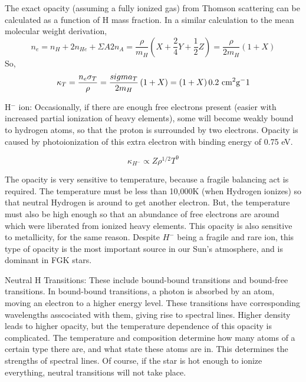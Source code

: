 \begin{enumerate}
      The exact opacity (assuming a fully ionized gas) from Thomson scattering can be calculated 
      as a function of H mass fraction.  In a similar calculation to the mean molecular weight 
      derivation, 
      \begin{equation}
      n_e=n_H+2n_{He}+\Sigma{A}{2}n_A=\frac{\rho}{m_H}\left(X+\frac{2}{4}Y+\frac{1}{2}Z\right)=\frac{\rho}{2m_H}\left(1+X\right)
      \end{equation}
      So,
      \begin{equation}
      \kappa_T=\frac{n_e\sigma_T}{\rho}=\frac{sigma_T}{2m_H}\left(1+X\right)=\left(1+X\right)0.2~{\rm cm^2 g^-1}
      \end{equation}
       
      H$^-$ ion: Occasionally, if there are enough free electrons present (easier with increased partial ionization of heavy elements), some will become weakly bound to hydrogen atoms, so that the proton is surrounded by two electrons. Opacity is caused by photoionization of this extra electron with binding energy of 0.75 eV. 
      
      \begin{equation}
      \kappa_{H^{-}} \propto Z \rho^{1/2} T^{9}
      \end{equation}
      
      The opacity is very sensitive to temperature, because a fragile balancing act is required. The temperature must be less than 10,000K (when Hydrogen ionizes) so that neutral Hydrogen is around to get another electron. But, the temperature must also be high enough so that an abundance of free electrons are around which were liberated from ionized heavy elements. This opacity is also sensitive to metallicity, for the same reason. 
      Despite $H^{-}$ being a fragile and rare ion, this type of opacity is the most important source in our Sun's atmosphere, and is dominant in FGK stars.

      Neutral H Transitions:
      These include bound-bound transitions and bound-free transitions.  In bound-bound 
      transitions, a photon is absorbed by an atom, moving an electron to a higher energy level.  
      These transitions have corresponding wavelengths asscociated with them, giving rise 
      to spectral lines.  Higher density leads to higher opacity, but the temperature 
      dependence of this opacity is complicated.  The temperature and composition determine 
      how many atoms of a certain type there are, and what state these atoms are in.  This 
      determines the strengths of spectral lines.  Of course, if the star is hot enough to 
      ionize everything, neutral transitions will not take place.
      

\end{enumerate}
